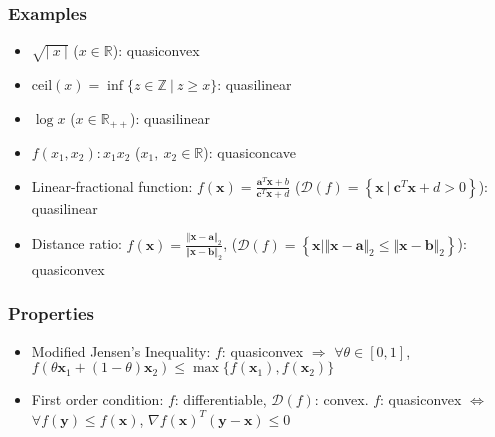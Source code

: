 \subsubsection*{Examples}
\begin{itemize}
    \item $\sqrt{|~x~|}$ ($x \in \mathbb{R}$): quasiconvex
    \item $\mathrm{ceil}(x) = \inf \{z \in \mathbb{Z}~|~z \geq x \}$: quasilinear
    \item $\log x$ ($x \in \mathbb{R}_{++}$): quasilinear
    \item $f(x_1, x_2): x_1 x_2$ ($x_1,~x_2 \in \mathbb{R}$): quasiconcave
    \item Linear-fractional function: $f(\mathbf{x}) = \frac {\mathbf{a}^T\mathbf{x} + b} {\mathbf{c}^T\mathbf{x} + d}$
        ($\mathcal{D}(f) = \left\{\mathbf{x}~|~\mathbf{c}^T\mathbf{x} + d > 0 \right\}$): quasilinear
    \item Distance ratio: $f(\mathbf{x}) = \frac {\Vert \mathbf{x} - \mathbf{a} \Vert_2} {\Vert \mathbf{x} - \mathbf{b} \Vert_2}$,
    ($\mathcal{D}(f) = \left\{\mathbf{x}|\Vert\mathbf{x}-\mathbf{a}\Vert_2 \leq \Vert\mathbf{x}-\mathbf{b}\Vert_2 \right\}$): quasiconvex
\end{itemize}

\subsubsection*{Properties}
\begin{itemize}
    \item Modified Jensen's Inequality: $f$: quasiconvex $\Rightarrow$ $\forall \theta \in [0,1]$,
        $f(\theta\mathbf{x}_1 + (1 - \theta)\mathbf{x}_2) \leq \max\{f(\mathbf{x}_1), f(\mathbf{x}_2)\}$
    \item First order condition: $f$: differentiable, $\mathcal{D}(f)$: convex. $f$: quasiconvex
        $\Leftrightarrow$ $\forall f(\mathbf{y}) \leq f(\mathbf{x})$,
        $\nabla f(\mathbf{x})^T (\mathbf{y} - \mathbf{x}) \leq 0 $
\end{itemize}

